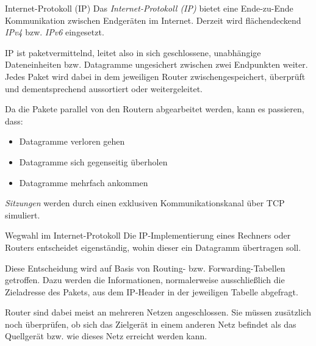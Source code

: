 \begin{defi}{Internet-Protokoll (IP)}
    Das \emph{Internet-Protokoll (IP)} bietet eine Ende-zu-Ende Kommunikation zwischen Endgeräten im Internet.
    Derzeit wird flächendeckend \emph{IPv4} bzw. \emph{IPv6} eingesetzt.
    
    IP ist paketvermittelnd, leitet also in sich geschlossene, unabhängige Dateneinheiten bzw. Datagramme ungesichert zwischen zwei Endpunkten weiter.
    Jedes Paket wird dabei in dem jeweiligen Router zwischengespeichert, überprüft und dementsprechend aussortiert oder weitergeleitet.
    
    Da die Pakete parallel von den Routern abgearbeitet werden, kann es passieren, dass:
    \begin{itemize}
        \item Datagramme verloren gehen
        \item Datagramme sich gegenseitig überholen
        \item Datagramme mehrfach ankommen
    \end{itemize}
    
    \emph{Sitzungen} werden durch einen exklusiven Kommunikationskanal über TCP simuliert.
\end{defi}

\begin{defi}{Wegwahl im Internet-Protokoll}
    Die IP-Implementierung eines Rechners oder Routers entscheidet eigenständig, wohin dieser ein Datagramm übertragen soll.
    
    Diese Entscheidung wird auf Basis von Routing- bzw. Forwarding-Tabellen getroffen.
    Dazu werden die Informationen, normalerweise ausschließlich die Zieladresse des Pakets, aus dem IP-Header in der jeweiligen Tabelle abgefragt.
    
    Router sind dabei meist an mehreren Netzen angeschlossen.
    Sie müssen zusätzlich noch überprüfen, ob sich das Zielgerät in einem anderen Netz befindet als das Quellgerät bzw. wie dieses Netz erreicht werden kann.
\end{defi}

